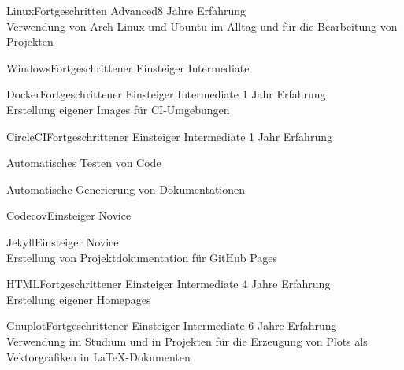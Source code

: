 \documentclass[a4paper,8pt]{cv}
\begin{document}
      \vspace{-1.8em}
      \begin{multicols}{2}
        \begin{cvSkillItem}{Linux}{Fortgeschritten}
          Advanced\hfill 8 Jahre Erfahrung \\[1pt]
          Verwendung von Arch Linux und Ubuntu im Alltag und für die Bearbeitung von Projekten
        \end{cvSkillItem}
        \begin{cvSkillItem}{Windows}{Fortgeschrittener Einsteiger}
          Intermediate
        \end{cvSkillItem}
        \begin{cvSkillItem}{Docker}{Fortgeschrittener Einsteiger}
          Intermediate \hfill 1 Jahr Erfahrung \\[1pt]
          Erstellung eigener Images für CI-Umgebungen
        \end{cvSkillItem}
        \begin{cvSkillItem}{CircleCI}{Fortgeschrittener Einsteiger}
          Intermediate \hfill 1 Jahr Erfahrung
          \begin{cvItemize}
            \item Automatisches Testen von Code
            \item Automatische Generierung von Dokumentationen
          \end{cvItemize}
        \end{cvSkillItem}
        \begin{cvSkillItem}{Codecov}{Einsteiger}
          Novice
        \end{cvSkillItem}
        \begin{cvSkillItem}{Jekyll}{Einsteiger}
          Novice \\[1pt]
          Erstellung von Projektdokumentation für GitHub Pages
        \end{cvSkillItem}
        \begin{cvSkillItem}{HTML}{Fortgeschrittener Einsteiger}
          Intermediate \hfill 4 Jahre Erfahrung \\[1pt]
          Erstellung eigener Homepages
        \end{cvSkillItem}
        \begin{cvSkillItem}{Gnuplot}{Fortgeschrittener Einsteiger}
          Intermediate \hfill 6 Jahre Erfahrung \\[1pt]
          Verwendung im Studium und in Projekten für die Erzeugung von Plots als Vektorgrafiken in LaTeX-Dokumenten
        \end{cvSkillItem}
      \end{multicols}
\end{document}
